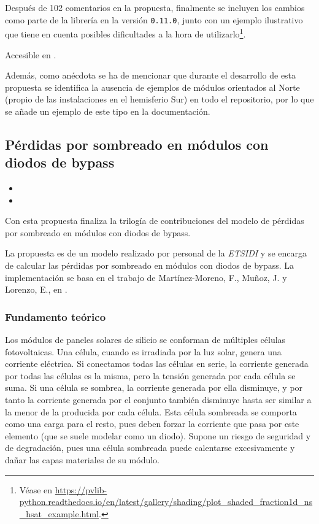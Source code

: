 Después de 102 comentarios en la propuesta, finalmente se incluyen los cambios como parte de la librería en la versión \texttt{0.11.0}, junto con un ejemplo ilustrativo que tiene en cuenta posibles dificultades a la hora de utilizarlo\footnote{Véase en \url{https://pvlib-python.readthedocs.io/en/latest/gallery/shading/plot_shaded_fraction1d_ns_hsat_example.html}.}.

Accesible en .

Además, como anécdota se ha de mencionar que durante el desarrollo de esta propuesta se identifica la ausencia de ejemplos de módulos orientados al Norte (propio de las instalaciones en el hemisferio Sur) en todo el repositorio, por lo que se añade un ejemplo de este tipo en la documentación.

\subsection{Pérdidas por sombreado en módulos con diodos de bypass} \label{sct:desarrollo:contribuciones_cientificas:perdidas_sombreado}

\begin{itemize}
    \item {}
    \item {}
\end{itemize}

Con esta propuesta finaliza la trilogía de contribuciones del modelo de pérdidas por sombreado en módulos con diodos de bypass.

La propuesta es de un modelo realizado por personal de la \textit{ETSIDI} y se encarga de calcular las pérdidas por sombreado en módulos con diodos de bypass. La implementación se basa en el trabajo de Martínez-Moreno, F., Muñoz, J. y Lorenzo, E., en \cite{Martínez-Moreno_Muñoz_Lorenzo_2010}.

\subsubsection{Fundamento teórico}

Los módulos de paneles solares de silicio se conforman de múltiples células fotovoltaicas. Una célula, cuando es irradiada por la luz solar, genera una corriente eléctrica. Si conectamos todas las células en serie, la corriente generada por todas las células es la misma, pero la tensión generada por cada célula se suma. Si una célula se sombrea, la corriente generada por ella disminuye, y por tanto la corriente generada por el conjunto también disminuye hasta ser similar a la menor de la producida por cada célula. Esta célula sombreada se comporta como una carga para el resto, pues deben forzar la corriente que pasa por este elemento (que se suele modelar como un diodo). Supone un riesgo de seguridad y de degradación, pues una célula sombreada puede calentarse excesivamente y dañar las capas materiales de su módulo.

